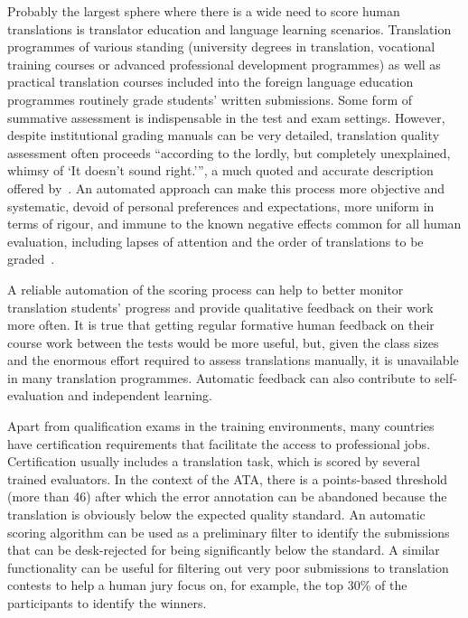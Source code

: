 Probably the largest sphere where there is a wide need to score human translations is translator education and language learning scenarios. Translation programmes of various standing (university degrees in translation, vocational training courses or advanced professional development programmes) as well as practical translation courses included into the foreign language education programmes routinely grade students' written submissions. Some form of summative assessment is indispensable in the test and exam settings. However, despite institutional grading manuals can be very detailed, translation quality assessment often proceeds ``according to the lordly, but completely unexplained, whimsy of `It doesn't sound right.''', a much quoted and accurate description offered by~\citet[p. 142]{Fawcett1981}. An automated approach can make this process more objective and systematic, devoid of personal preferences and expectations, more uniform in terms of rigour, and immune to the known negative effects common for all human evaluation, including lapses of attention and the order of translations to be graded~\cite{MinacoriVibert2010}.    

A reliable automation of the scoring process can help to better monitor translation students' progress and provide qualitative feedback on their work more often. It is true that getting regular formative human feedback on their course work between the tests would be more useful, but, given the class sizes and the enormous effort required to assess translations manually, it is unavailable in many translation programmes.
Automatic feedback can also contribute to self-evaluation and independent learning. 

Apart from qualification exams in the training environments, many countries have certification requirements that facilitate the access to professional jobs. Certification usually includes a translation task, which is scored by several trained evaluators. In the context of the \gls{ATA}, there is a points-based threshold (more than 46) after which the error annotation can be abandoned because the translation is obviously below the expected quality standard. An automatic scoring algorithm can be used as a preliminary filter to identify the submissions that can be desk-rejected for being significantly below the standard. A similar functionality can be useful for filtering out very poor submissions to translation contests to help a human jury focus on, for example, the top 30\% of the participants to identify the winners. 

